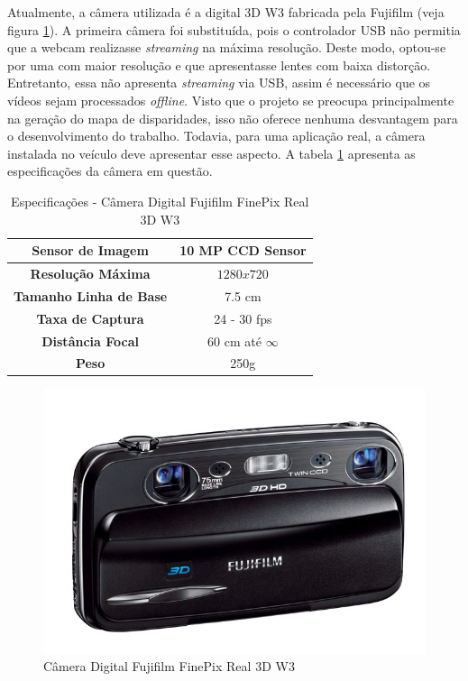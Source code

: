 Atualmente, a câmera utilizada é a digital 3D W3 fabricada pela Fujifilm (veja figura \ref{fujiW3}). A primeira câmera foi substituída, pois o controlador USB não permitia que a webcam realizasse \textit{streaming} na máxima resolução. Deste modo, optou-se por uma com maior resolução e que apresentasse lentes com baixa distorção. Entretanto, essa não apresenta \textit{streaming} via USB, assim é necessário que os vídeos sejam processados \textit{offline}. Visto que o projeto se preocupa principalmente na geração do mapa de disparidades, isso não oferece nenhuma desvantagem para o desenvolvimento do trabalho. Todavia, para uma aplicação real, a câmera instalada no veículo deve apresentar esse aspecto. A tabela \ref{fujiW3_tab} apresenta as especificações da câmera em questão.

\begin{table}[]
\centering
\caption{Especificações - Câmera Digital Fujifilm FinePix Real 3D W3}
\label{fujiW3_tab}
\begin{tabular}{|c|c|}
\hline
\textbf{Sensor de Imagem}      & 10 MP CCD Sensor  	\\	\hline
\textbf{Resolução Máxima}      & $1280x720$        	\\	\hline
\textbf{Tamanho Linha de Base} & 7.5 cm             	\\	\hline
\textbf{Taxa de Captura}      & 24 - 30 fps          	\\	\hline
\textbf{Distância Focal}       & 60 cm até $\infty$	\\	\hline
\textbf{Peso}       		      & 250g		\\	\hline
\end{tabular}
\end{table}

\begin{figure}[H]
	\centering
	\includegraphics[scale=0.35]{./Resources/fujiW3.jpg}
	\caption{Câmera Digital Fujifilm FinePix Real 3D W3}
	\label{fujiW3}
\end{figure}


